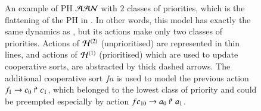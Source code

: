 \begin{figure}[p]
  \centering
  \caption{
  \label{fig:metazoan-ph}
    An example of PH $\mathcal{AAN}$ with $2$ classes of priorities,
    which is the flattening of the PH in .
    In other words, this model has exactly the same dynamics as
    , but its actions make only two classes of priorities.
    Actions of $\mathcal{H}^{(2)}$ (unprioritised) are represented in thin lines,
    and actions of $\mathcal{H}^{(1)}$ (prioritised) which are used to update cooperative sorts,
    are abstracted by thick dashed arrows.
    The additional cooperative sort $fa$ is used to model the previous action
    $f_1\rightarrow c_0\Rsh c_1$,
    which belonged to the lowest class of priority and could be preempted 
    especially by action $fc_{10}\rightarrow a_0\Rsh a_1$.
  }
\end{figure}

